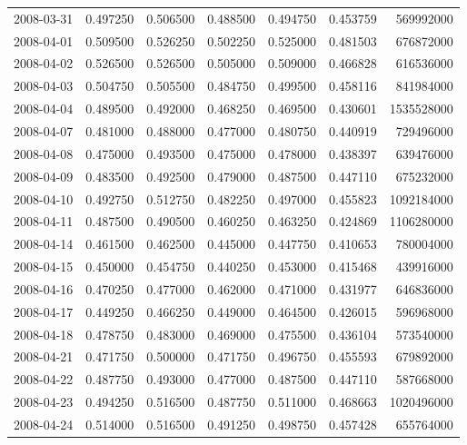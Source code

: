 \begin{tabular}{lrrrrrr}
2008-03-31 &    0.497250 &    0.506500 &    0.488500 &    0.494750 &    0.453759 &   569992000 \\
2008-04-01 &    0.509500 &    0.526250 &    0.502250 &    0.525000 &    0.481503 &   676872000 \\
2008-04-02 &    0.526500 &    0.526500 &    0.505000 &    0.509000 &    0.466828 &   616536000 \\
2008-04-03 &    0.504750 &    0.505500 &    0.484750 &    0.499500 &    0.458116 &   841984000 \\
2008-04-04 &    0.489500 &    0.492000 &    0.468250 &    0.469500 &    0.430601 &  1535528000 \\
2008-04-07 &    0.481000 &    0.488000 &    0.477000 &    0.480750 &    0.440919 &   729496000 \\
2008-04-08 &    0.475000 &    0.493500 &    0.475000 &    0.478000 &    0.438397 &   639476000 \\
2008-04-09 &    0.483500 &    0.492500 &    0.479000 &    0.487500 &    0.447110 &   675232000 \\
2008-04-10 &    0.492750 &    0.512750 &    0.482250 &    0.497000 &    0.455823 &  1092184000 \\
2008-04-11 &    0.487500 &    0.490500 &    0.460250 &    0.463250 &    0.424869 &  1106280000 \\
2008-04-14 &    0.461500 &    0.462500 &    0.445000 &    0.447750 &    0.410653 &   780004000 \\
2008-04-15 &    0.450000 &    0.454750 &    0.440250 &    0.453000 &    0.415468 &   439916000 \\
2008-04-16 &    0.470250 &    0.477000 &    0.462000 &    0.471000 &    0.431977 &   646836000 \\
2008-04-17 &    0.449250 &    0.466250 &    0.449000 &    0.464500 &    0.426015 &   596968000 \\
2008-04-18 &    0.478750 &    0.483000 &    0.469000 &    0.475500 &    0.436104 &   573540000 \\
2008-04-21 &    0.471750 &    0.500000 &    0.471750 &    0.496750 &    0.455593 &   679892000 \\
2008-04-22 &    0.487750 &    0.493000 &    0.477000 &    0.487500 &    0.447110 &   587668000 \\
2008-04-23 &    0.494250 &    0.516500 &    0.487750 &    0.511000 &    0.468663 &  1020496000 \\
2008-04-24 &    0.514000 &    0.516500 &    0.491250 &    0.498750 &    0.457428 &   655764000 \\

\end{tabular}
